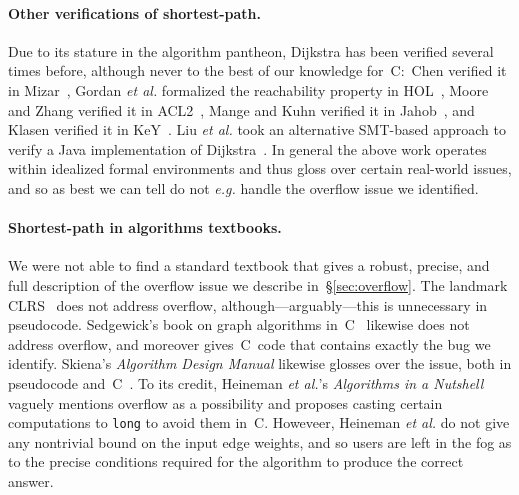 \paragraph{Other verifications of shortest-path.}
Due to its stature in the algorithm pantheon, Dijkstra has been verified several times before, although never to the best of our knowledge for~C:~Chen verified it in Mizar~\cite{chen2003dijkstra}, Gordan \emph{et al.} formalized the reachability property in HOL~\cite{gordon2003executing}, Moore and Zhang verified it in ACL2~\cite{Moore2005}, Mange and Kuhn verified it in Jahob~\cite{mange2007verifying}, and Klasen verified it in KeY~\cite{klasen2010verifying}.  Liu \emph{et al.} took an alternative SMT-based approach to verify a Java implementation of Dijkstra~\cite{6200101}.  In general the above work operates within
idealized formal environments and thus gloss over certain real-world issues, and so as best we 
can tell do not \emph{e.g.} handle the overflow issue we identified.



\paragraph{Shortest-path in algorithms textbooks.}  
We were not able to find a standard textbook that gives a robust, precise,
and full description of the overflow issue we describe in~\S\ref{sec:overflow}.
The landmark CLRS~\cite{clrs} does not address overflow, although---arguably---this is unnecessary in pseudocode.  Sedgewick's book on graph algorithms in~C~\cite{robert2002algorithms} likewise does not address overflow, and moreover gives~C~code
that contains exactly the bug we identify.  Skiena's \emph{Algorithm Design Manual} likewise 
glosses over the issue, both
in pseudocode and~C~\cite{DBLP:books/daglib/0022194}.
To its credit, Heineman \emph{et al.}'s \emph{Algorithms in a Nutshell}~\cite{heineman2008algorithms} vaguely mentions overflow as a possibility and 
proposes casting certain computations to \texttt{long} to avoid them in~C.  Howeveer, Heineman 
\emph{et al.} do not give any
nontrivial bound on the input edge weights, and so users are left in the fog as to the precise
conditions required for the algorithm to produce the correct answer.


